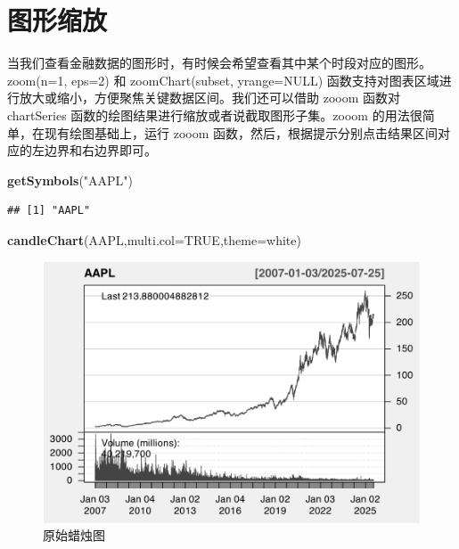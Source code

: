 \documentclass[]{ctexbook}
\newenvironment{Shaded}{\begin{snugshade}}{\end{snugshade}}
\newcommand{\AttributeTok}[1]{\textcolor[rgb]{0.13,0.29,0.53}{#1}}
\newcommand{\ConstantTok}[1]{\textcolor[rgb]{0.56,0.35,0.01}{#1}}
\newcommand{\FunctionTok}[1]{\textcolor[rgb]{0.13,0.29,0.53}{\textbf{#1}}}
\newcommand{\NormalTok}[1]{#1}
\newcommand{\StringTok}[1]{\textcolor[rgb]{0.31,0.60,0.02}{#1}}
\begin{document}
\section{图形缩放}\label{ux56feux5f62ux7f29ux653e}

当我们查看金融数据的图形时，有时候会希望查看其中某个时段对应的图形。zoom(n=1, eps=2) 和 zoomChart(subset, yrange=NULL) 函数支持对图表区域进行放大或缩小，方便聚焦关键数据区间。我们还可以借助 zooom 函数对 chartSeries 函数的绘图结果进行缩放或者说截取图形子集。zooom 的用法很简单，在现有绘图基础上，运行 zooom 函数，然后，根据提示分别点击结果区间对应的左边界和右边界即可。

\begin{Shaded}
\begin{Highlighting}[]
\FunctionTok{getSymbols}\NormalTok{(}\StringTok{"AAPL"}\NormalTok{)}
\end{Highlighting}
\end{Shaded}

\begin{verbatim}
## [1] "AAPL"
\end{verbatim}

\begin{Shaded}
\begin{Highlighting}[]
\FunctionTok{candleChart}\NormalTok{(AAPL,}\AttributeTok{multi.col=}\ConstantTok{TRUE}\NormalTok{,}\AttributeTok{theme=}\StringTok{\textquotesingle{}white\textquotesingle{}}\NormalTok{) }
\end{Highlighting}
\end{Shaded}

\begin{figure}
\includegraphics[width=0.9\linewidth]{QuantmodHandbook_files/figure-latex/zoom-1} \caption{原始蜡烛图}\label{fig:zoom}
\end{figure}
\end{document}
